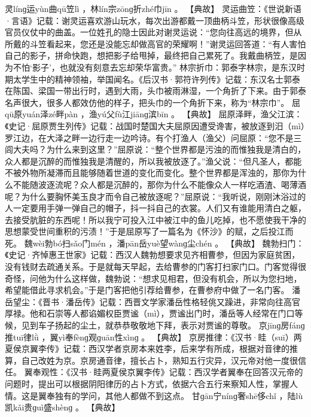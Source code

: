 \documentclass[12pt,UTF8]{ctexbook}
\begin{document}
灵línɡ运yùn曲qū笠lì
，林lín宗zōnɡ折zhé巾jīn
。
【典故】
灵运曲笠：《世说新语·言语》记载：谢灵运喜欢游山玩水，每次出游都戴一顶曲柄斗笠，形状很像高级官员仪仗中的曲盖。一位姓孔的隐士因此对谢灵运说：“您向往高远的境界，但从所戴的斗笠看起来，您还是没能忘却做高官的荣耀啊！”谢灵运回答道：“有人害怕自己的影子，拼命快跑，想把影子给甩掉，最终把自己累死了。我戴曲柄笠，是因为不怕‘影子’，也就没有刻意去忘却荣华富贵。”
林宗折巾：郭泰字林宗，是东汉时期太学生中的精神领袖，举国闻名。《后汉书·郭符许列传》记载：东汉名士郭泰在陈国、梁国一带出行时，遇到大雨，头巾被雨淋湿，一个角折了下来。由于郭泰名声很大，很多人都效仿他的样子，把头巾的一个角折下来，称为“林宗巾”。
屈qū原yuán泽zé畔pàn
，渔yú父fù江jiānɡ滨bīn
。
【典故】
屈原泽畔，渔父江滨：《史记·屈原贾生列传》记载：战国时楚国大夫屈原因遭受谗害，被放逐到汨（mì）罗江边，在大泽之畔一边行走一边吟诗。有个打渔人（渔父）问屈原：“您不是三闾大夫吗？为什么来到这里？”屈原说：“整个世界都是污浊的而惟独我是清白的，众人都是沉醉的而惟独我是清醒的，所以我被放逐了。”渔父说：“但凡圣人，都能不被外物所凝滞而且能够随着世道的变化而变化。整个世界都是浑浊的，那你为什么不能随波逐流呢？众人都是沉醉的，那你为什么不能像众人一样吃酒渣、喝薄酒呢？为什么要胸怀美玉良才而令自己被放逐呢？”屈原说：“我听说，刚刚沐浴过的人一定要用手弹一弹自己的帽子，抖一抖自己的衣裳。人们又有谁能用清白之躯，去接受肮脏的东西呢！所以我宁可投入江中被江中的鱼儿吃掉，也不愿使我干净的思想蒙受世间重积的污渍！”于是屈原写了一篇名为《怀沙》的赋，之后投江而死。
魏wèi勃bó扫sǎo门mén
，潘pān岳yuè望wànɡ尘chén
。
【典故】
魏勃扫门：《史记·齐悼惠王世家》记载：西汉人魏勃想要求见齐相曹参，但因为家庭贫困，没有钱财去疏通关系。于是就每天早起，去给曹参的门客打扫家门口。门客觉得很奇怪，问他为什么这样做，魏勃说：“想求见相君，但没有机会，所以为您扫地，希望能借此寻求机会。”于是门客把他引荐给曹参，在曹参府中做了一名门客。
潘岳望尘：《晋书·潘岳传》记载：西晋文学家潘岳性格轻佻又躁进，非常向往高官厚禄。他和石崇等人都谄媚权臣贾谧（mì），贾谧出门时，潘岳等人经常在门口等候，见到车子扬起的尘土，就恭恭敬敬地下拜，表示对贾谧的尊敬。
京jīnɡ房fánɡ推tuī律lǜ
，翼yì奉fènɡ观ɡuān性xìnɡ
。
【典故】
京房推律：《汉书·眭（suī）两夏侯京翼李传》记载：西汉学者京房本来姓李，后来学有所成，根据对音律的推算，自己改姓为京。京房通音律，擅长占卜，熟知五行灾异，汉元帝对他一度很信任。
翼奉观性：《汉书·眭两夏侯京翼李传》记载：西汉学者翼奉在回答汉元帝的问题时，提出可以根据阴阳律历的占卜方式，依据六合五行来察知人性，掌握人情。这是翼奉独有的学问，其他人都做不到这点。
甘ɡān宁nínɡ奢shē侈chǐ
，陆lù凯kǎi贵ɡuì盛shènɡ
。
【典故】
\end{document}
